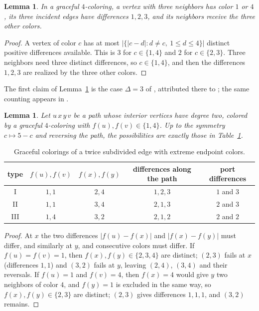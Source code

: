 \documentclass[11pt]{article}
\newtheorem{lemma}[theorem]{Lemma}
\theoremstyle{remark}
\begin{document}
\begin{lemma}\label{lem:star}
In a graceful $4$-coloring, a vertex with three neighbors has color $1$ or
$4$, its three incident edges have differences $1,2,3$, and its neighbors
receive the three other colors.
\end{lemma}

\begin{proof}
A vertex of color $c$ has at most $|\{|c-d|: d\neq c,\ 1\le d\le 4\}|$ distinct
positive differences available. This is $3$ for $c\in\{1,4\}$ and $2$ for
$c\in\{2,3\}$. Three neighbors need three distinct differences, so
$c\in\{1,4\}$, and then the differences $1,2,3$ are realized by the three
other colors.
\end{proof}

The first claim of Lemma~\ref{lem:star} is the case $\Delta=3$ of
\cite[Lemma~6]{Pantoja}, attributed there to \cite{PDL381}; the same counting
appears in \cite[proof of Construction~1]{ALD}.

\begin{lemma}\label{lem:path}
Let $u\,x\,y\,v$ be a path whose interior vertices have degree two, colored
by a graceful $4$-coloring with $f(u),f(v)\in\{1,4\}$. Up to the symmetry
$c\mapsto 5-c$ and reversing the path, the possibilities are exactly those in
Table~\ref{tab:path}.
\end{lemma}

\begin{table}[h]
\centering
\begin{tabular}{ccccc}
\toprule
type & $f(u),f(v)$ & $f(x),f(y)$ & differences along the path & port differences \\
\midrule
I & $1,1$ & $2,4$ & $1,2,3$ & $1$ and $3$ \\
II & $1,1$ & $3,4$ & $2,1,3$ & $2$ and $3$ \\
III & $1,4$ & $3,2$ & $2,1,2$ & $2$ and $2$ \\
\bottomrule
\end{tabular}
\caption{Graceful colorings of a twice subdivided edge with extreme endpoint colors.}
\label{tab:path}
\end{table}

\begin{proof}
At $x$ the two differences $|f(u)-f(x)|$ and $|f(x)-f(y)|$ must differ, and
similarly at $y$, and consecutive colors must differ. If $f(u)=f(v)=1$, then
$f(x),f(y)\in\{2,3,4\}$ are distinct; $(2,3)$ fails at $x$ (differences
$1,1$) and $(3,2)$ fails at $y$, leaving $(2,4)$, $(3,4)$ and their reversals.
If $f(u)=1$ and $f(v)=4$, then $f(x)=4$ would give $y$ two neighbors of color
$4$, and $f(y)=1$ is excluded in the same way, so $f(x),f(y)\in\{2,3\}$ are
distinct; $(2,3)$ gives differences $1,1,1$, and $(3,2)$ remains.
\end{proof}
\end{document}
